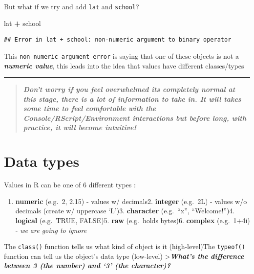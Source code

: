 \documentclass[
]{article}
\newenvironment{Shaded}{\begin{snugshade}}{\end{snugshade}}
\newcommand{\NormalTok}[1]{#1}
\newcommand{\OperatorTok}[1]{\textcolor[rgb]{0.81,0.36,0.00}{\textbf{#1}}}
\newcommand{\StringTok}[1]{\textcolor[rgb]{0.31,0.60,0.02}{#1}}
\providecommand{\tightlist}{%
  \setlength{\itemsep}{0pt}\setlength{\parskip}{0pt}}
\begin{document}
But what if we try and add \texttt{lat} and \texttt{school}?

\begin{Shaded}
\begin{Highlighting}[]
\NormalTok{lat }\OperatorTok{+}\StringTok{ }\NormalTok{school}
\end{Highlighting}
\end{Shaded}

\begin{verbatim}
## Error in lat + school: non-numeric argument to binary operator
\end{verbatim}

This \texttt{non-numeric\ argument\ error} is saying that one of these
objects is not a \textbf{\emph{numeric value}}, this leads into the idea
that values have different classes/types

\begin{center}\rule{0.5\linewidth}{0.5pt}\end{center}

\begin{quote}
\textbf{\emph{Don't worry if you feel overwhelmed its completely normal
at this stage, there is a lot of information to take in. It will takes
some time to feel comfortable with the Console/RScript/Environment
interactions but before long, with practice, it will become intuitive!}}
\end{quote}

\hypertarget{data-types}{%
\section{\texorpdfstring{\textbf{Data
types}}{Data types}}\label{data-types}}

Values in R can be one of 6 different types :

\begin{enumerate}
\def\labelenumi{\arabic{enumi}.}
\tightlist
\item
  \textbf{numeric} (e.g.~2, 2.15) - values w/ decimals2.
  \textbf{integer} (e.g.~2L) - values w/o decimals (create w/ uppercase
  `L')3. \textbf{character} (e.g.~``x'', ``Welcome!'')4.
  \textbf{logical} (e.g.~TRUE, FALSE)5. \textbf{raw} (e.g.~holds
  bytes)6. \textbf{complex} (e.g.~1+4i) - \emph{we are going to ignore}
\end{enumerate}

The \texttt{class()} function tells us what kind of object is it
(high-level)The \texttt{typeof()} function can tell us the object's data
type (low-level) \textgreater{}\textbf{\emph{What's the difference
between 3 (the number) and `3' (the character)?}}
\end{document}
